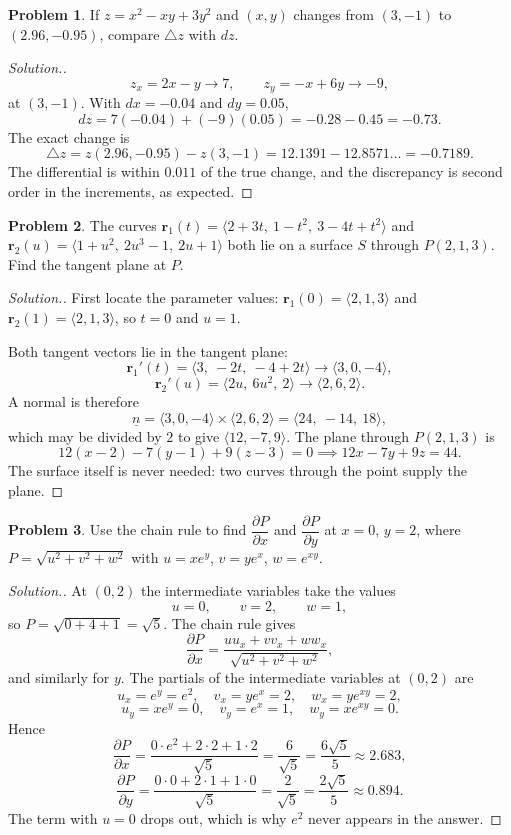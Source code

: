 \documentclass[11pt,a4paper]{article}
\theoremstyle{definition}
\newtheorem{problemx}{Problem}[subsection]
\newenvironment{problem}{\begin{problemx}}{\end{problemx}}
\newenvironment{solution}
  {\renewcommand{\qedsymbol}{}\begin{proof}[\textit{Solution}.]}
  {\end{proof}}
\begin{document}
\begin{problem}
If $z = x^2-xy+3y^2$ and $(x,y)$ changes from $(3,-1)$ to $(2.96,-0.95)$,
compare $\triangle z$ with $dz$.
\end{problem}
\begin{solution}
$$z_x = 2x-y \longrightarrow 7,\qquad z_y = -x+6y \longrightarrow -9 ,$$
at $(3,-1)$. With $dx = -0.04$ and $dy = 0.05$,
$$dz = 7(-0.04) + (-9)(0.05) = -0.28 - 0.45 = -0.73 .$$
The exact change is
$$\triangle z = z(2.96,-0.95) - z(3,-1) = 12.1391 - 12.8571\ldots = -0.7189 .$$
The differential is within $0.011$ of the true change, and the discrepancy is
second order in the increments, as expected.
\end{solution}

\begin{problem}
The curves
$\textbf{r}_1(t) = \langle 2+3t,\ 1-t^2,\ 3-4t+t^2\rangle$ and
$\textbf{r}_2(u) = \langle 1+u^2,\ 2u^3-1,\ 2u+1\rangle$ both lie on a surface
$S$ through $P(2,1,3)$. Find the tangent plane at $P$.
\end{problem}
\begin{solution}
First locate the parameter values: $\textbf{r}_1(0) = \langle 2,1,3\rangle$ and
$\textbf{r}_2(1) = \langle 2,1,3\rangle$, so $t=0$ and $u=1$.

Both tangent vectors lie in the tangent plane:
$$\textbf{r}_1{}'(t) = \langle 3,\ -2t,\ -4+2t\rangle
\longrightarrow \langle 3,0,-4\rangle ,$$
$$\textbf{r}_2{}'(u) = \langle 2u,\ 6u^2,\ 2\rangle
\longrightarrow \langle 2,6,2\rangle .$$
A normal is therefore
$$\underline{n} = \langle 3,0,-4\rangle\times\langle 2,6,2\rangle
= \langle 24,\ -14,\ 18\rangle ,$$
which may be divided by $2$ to give $\langle 12,-7,9\rangle$. The plane through
$P(2,1,3)$ is
$$12(x-2) - 7(y-1) + 9(z-3) = 0 \implies 12x - 7y + 9z = 44 .$$
The surface itself is never needed: two curves through the point supply the
plane.
\end{solution}

\begin{problem}
Use the chain rule to find $\dfrac{\partial P}{\partial x}$ and
$\dfrac{\partial P}{\partial y}$ at $x=0$, $y=2$, where
$P = \sqrt{u^2+v^2+w^2}$ with $u = xe^y$, $v = ye^x$, $w = e^{xy}$.
\end{problem}
\begin{solution}
At $(0,2)$ the intermediate variables take the values
$$u = 0,\qquad v = 2,\qquad w = 1 ,$$
so $P = \sqrt{0+4+1} = \sqrt5$. The chain rule gives
$$\frac{\partial P}{\partial x}
= \frac{u u_x + v v_x + w w_x}{\sqrt{u^2+v^2+w^2}},$$
and similarly for $y$. The partials of the intermediate variables at $(0,2)$
are
$$u_x = e^y = e^2,\quad v_x = ye^x = 2,\quad w_x = ye^{xy} = 2,$$
$$u_y = xe^y = 0,\quad v_y = e^x = 1,\quad w_y = xe^{xy} = 0 .$$
Hence
$$\frac{\partial P}{\partial x}
= \frac{0\cdot e^2 + 2\cdot 2 + 1\cdot 2}{\sqrt5} = \frac{6}{\sqrt5}
= \frac{6\sqrt5}{5}\approx 2.683 ,$$
$$\frac{\partial P}{\partial y}
= \frac{0\cdot 0 + 2\cdot 1 + 1\cdot 0}{\sqrt5} = \frac{2}{\sqrt5}
= \frac{2\sqrt5}{5}\approx 0.894 .$$
The term with $u = 0$ drops out, which is why $e^2$ never appears in the answer.
\end{solution}
\end{document}
